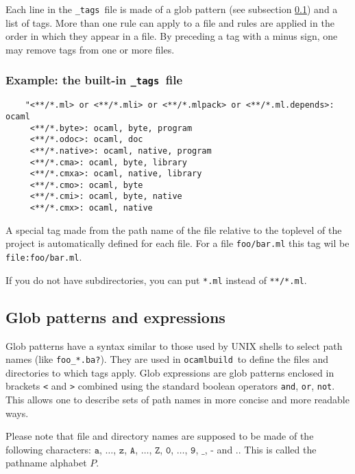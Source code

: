 \documentclass[12pt]{article}
\newcommand{\ocb}{\texttt{ocamlbuild}~}
\newcommand{\tags}{\texttt{\_tags}~}
\begin{document}
Each line in the \tags file is made of a glob pattern (see subsection
\ref{subsec:glob}) and a list of tags.  More than one rule can apply to a file
and rules are applied in the order in which they appear in a file.
By preceding a tag with a minus sign, one may remove tags from one or more files.

\subsubsection{Example: the built-in \tags file}
\begin{verbatim}
    "<**/*.ml> or <**/*.mli> or <**/*.mlpack> or <**/*.ml.depends>: ocaml
     <**/*.byte>: ocaml, byte, program
     <**/*.odoc>: ocaml, doc
     <**/*.native>: ocaml, native, program
     <**/*.cma>: ocaml, byte, library
     <**/*.cmxa>: ocaml, native, library
     <**/*.cmo>: ocaml, byte
     <**/*.cmi>: ocaml, byte, native
     <**/*.cmx>: ocaml, native
\end{verbatim}

A special tag made from the path name of the file relative to the toplevel
of the project is automatically defined for each file.  For a file
\texttt{foo/bar.ml} this tag wil be \texttt{file:foo/bar.ml}.

If you do not have subdirectories, you can put \texttt{*.ml} instead of
\texttt{**/*.ml}.
\subsection{Glob patterns and expressions}
\label{subsec:glob}
Glob patterns have a syntax similar to those used by UNIX shells to select path
names (like \texttt{foo\_*.ba?}).  They are used in \ocb to define the files
and directories to which tags apply.  Glob expressions are glob patterns
enclosed in brackets \texttt{<} and \texttt{>} combined using the standard
boolean operators \texttt{and}, \texttt{or}, \texttt{not}.  This allows one to
describe sets of path names in more concise and more readable ways.

Please note that file and directory names are supposed to be made of the
following characters: $\texttt{a}$, $\dots$, $\texttt{z}$, $\texttt{A}$,
$\dots$, $\texttt{Z}$, $\texttt{0}$, $\dots$, $\texttt{9}$, $\texttt{\_}$,
$\texttt{-}$ and $\texttt{.}$.  This is called the pathname alphabet $P$.
\end{document}
